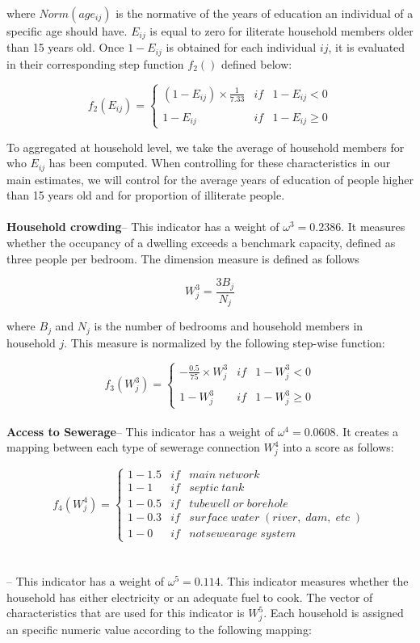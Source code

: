 \documentclass[dv_diss_main.tex]{subfiles}
\begin{document}
where  $Norm(age_{ij})$ is the normative of the years of education an individual of a specific age should have. $E_{ij}$ is equal to zero for iliterate household members older than 15 years old. Once $1-E_{ij}$ is obtained for each individual $ij$, it is evaluated in their corresponding step function $f_2()$ defined below:

$$ f_2(E_{ij})= \left\{ \begin{array}{ccc}
(1-E_{ij}) \times \frac{1}{7.33} &   if & 1-E_{ij} < 0\\
\\ 	1-E_{ij} & if & 1-E_{ij} \geq 0
\end{array}$$

To aggregated at household level, we take the average of household members for who  $E_{ij}$ has been computed. When controlling for these characteristics in our main estimates, we will control for the average years of education of people higher than 15 years old and for proportion of illiterate people. 
\\
\\
{\bf Household crowding}-- This indicator has a weight of $\omega^{3} = 0.2386$. It measures whether the occupancy of a dwelling exceeds a benchmark capacity, defined as three people per bedroom. The dimension measure is defined as follows

$$W_{j}^{3} = \frac{3 B_{j}}{N_{j}}$$

where $B_{j}$ and $N_{j}$ is the number of bedrooms and household members in household $j$. This measure is normalized by the following step-wise function:

$$f_{3}(W_{j}^{3})= \left\{ 
\begin{array}{lcl}
    -\frac{0.5}{75}\times W_{j}^{3}  &   if  & 1-W_{j}^{3} < 0 \\
    \\ 	1- W_{j}^{3}                 &   if  & 1-W_{j}^{3} \geq 0
\end{array}$$
\\
{\bf Access to Sewerage}-- This indicator has a weight of $\omega^{4}=0.0608$. It creates a mapping between each type of sewerage connection $W^{4}_j$ into a score as follows: 

$$f_{4}(W_{j}^{4})= \left\{ 
\begin{array}{lcl}
    1-1.5    &   if  &  main\; network \\
    1-1      &   if  & septic\; tank \\
    1-0.5    &   if  & tubewell\; or \; borehole \\
    1-0.3    &   if  & surface\; water\; (river,\; dam,\;etc\; ) \\
    1-0      &   if  & not sewearage\; system 
\end{array}$$
\\
\\
\newpage
{}-- This indicator has a weight of $\omega^{5}=0.114$. This indicator measures whether the household has either electricity or an adequate fuel to cook. The vector of characteristics that are used for this indicator is $W^{5}_j$. Each household is assigned an specific numeric value according to the following mapping: 
\end{document}

